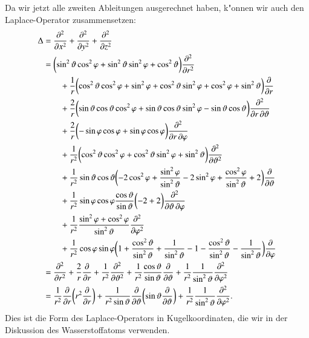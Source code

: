 Da wir jetzt alle zweiten Ableitungen ausgerechnet haben, k"onnen wir auch
den Laplace-Operator zusammensetzen:
\begin{align}
\Delta
&=
\frac{\partial^2}{\partial x^2}+
\frac{\partial^2}{\partial y^2}+
\frac{\partial^2}{\partial z^2}
\notag
\\
&=
\biggl(
\sin^2\vartheta\cos^2\varphi
+
\sin^2\vartheta\sin^2\varphi
+
\cos^2\vartheta
\biggr)
\frac{\partial^2}{\partial r^2}
\notag
\\
&\qquad
+
\frac1r\biggl(
\cos^2\vartheta\cos^2\varphi+\sin^2\varphi
+
\cos^2\vartheta\sin^2\varphi +\cos^2\varphi
+
\sin^2\vartheta
\biggr)
\frac{\partial}{\partial r}
\notag
\\
&\qquad
+
\frac2r\biggl(
\sin\vartheta\cos\vartheta\cos^2\varphi
+
\sin\vartheta\cos\vartheta\sin^2\varphi
-\sin\vartheta\cos\vartheta
\biggr)
\frac{\partial^2}{\partial r\,\partial\vartheta}
\notag
\\
&\qquad
+
\frac{2}{r}
\biggl(
-\sin\varphi\cos\varphi
+ \sin\varphi\cos\varphi
\biggr)
\frac{\partial^2}{\partial r\,\partial\varphi}
\notag
\\
&\qquad
+
\frac1{r^2}
\biggl(
\cos^2\vartheta\cos^2\varphi
+\cos^2\vartheta\sin^2\varphi
+\sin^2\vartheta
\biggr)
\frac{\partial^2}{\partial\vartheta^2}
\notag
\\
&\qquad
+
\frac1{r^2}
\sin\vartheta\cos\vartheta
\biggl(
-2 \cos^2\varphi
	+\frac{\sin^2\varphi}{\sin^2\vartheta}
-2\sin^2\varphi
+\frac{\cos^2\varphi}{\sin^2\vartheta}
+
2
\biggr)
\frac{\partial}{\partial\vartheta}
\notag
\\
&\qquad
+
\frac1{r^2}\sin\varphi\cos\varphi\frac{\cos\vartheta}{\sin\vartheta}
\biggl(
-2+2
\biggr)
\frac{\partial^2}{\partial\vartheta\,\partial\varphi}
\notag
\\
&\qquad
+
\frac1{r^2}\frac{\sin^2\varphi+\cos^2\varphi}{\sin^2\vartheta}
\frac{\partial^2}{\partial\varphi^2}
\notag
\\
&\qquad
+
\frac1{r^2}\cos\varphi\sin\varphi
\biggl(
1+\frac{\cos^2\vartheta}{\sin^2\vartheta}+\frac1{\sin^2\vartheta}
-1-\frac{\cos^2\vartheta}{\sin^2\vartheta}-\frac1{\sin^2\vartheta}
\biggr)
\frac{\partial}{\partial\varphi}
\notag
\\
&=
\frac{\partial^2}{\partial r^2}
+\frac{2}{r}\frac{\partial}{\partial r}
+\frac1{r^2}
\frac{\partial^2}{\partial\vartheta^2}
+
\frac1{r^2}
\frac{\cos\vartheta}{\sin\vartheta}
\frac{\partial}{\partial\vartheta}
+
\frac1{r^2}\frac1{\sin^2\vartheta}\frac{\partial^2}{\partial\varphi^2}
\notag
\\
&=
\frac1{r^2}\frac{\partial}{\partial r}\biggl(
r^2\frac{\partial}{\partial r}
\biggr)
+\frac1{r^2\sin\vartheta}\frac{\partial}{\partial\vartheta}\biggl(
\sin\vartheta\frac{\partial}{\partial\vartheta}
\biggr)
+\frac1{r^2}\frac1{\sin^2\vartheta}\frac{\partial^2}{\partial\varphi^2}.
\label{skript:laplacekugel}
\end{align}
Dies ist die Form des Laplace-Operators in Kugelkoordinaten, die
wir in der Diskussion des Wasserstoffatoms verwenden.

